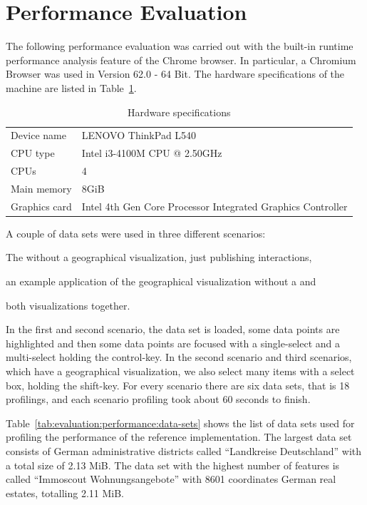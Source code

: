 \section{Performance Evaluation}

The following performance evaluation was carried out with the built-in runtime performance analysis feature of the Chrome browser.
In particular, a Chromium Browser was used in Version 62.0 - 64 Bit.
The hardware specifications of the machine are listed in Table~\ref{tab:evaluation:performance:hardware}.

\begin{table}[ht]
  \centering
  \begin{tabular}{ll}
    Device name & LENOVO ThinkPad L540 \\
    CPU type & Intel i3-4100M CPU @ 2.50GHz \\
    CPUs & 4 \\
    Main memory & 8GiB \\
    Graphics card & Intel 4th Gen Core Processor Integrated Graphics Controller \\
  \end{tabular}
  \caption{Hardware specifications}%
  \label{tab:evaluation:performance:hardware}
\end{table}

A couple of data sets were used in three different scenarios:
\begin{enumerate*}[label=(\arabic*)]
  \item The \tmap{} without a geographical visualization, just publishing interactions,
  \item an example application of the geographical visualization without a \tmap{} and
  \item both visualizations together.
\end{enumerate*}

In the first and second scenario, the data set is loaded, some data points are highlighted and then some data points are focused with a single-select and a multi-select holding the control-key.
In the second scenario and third scenarios, which have a geographical visualization, we also select many items with a select box, holding the shift-key.
For every scenario there are six data sets, that is 18 profilings, and each scenario profiling took about 60 seconds to finish.

Table~\ref{tab:evaluation:performance:data-sets} shows the list of data sets used for profiling the performance of the reference implementation.
The largest data set consists of German administrative districts called ``Landkreise Deutschland'' with a total size of 2.13 MiB.
The data set with the highest number of features is called ``Immoscout Wohnungsangebote'' with 8601 coordinates German real estates, totalling 2.11 MiB.


